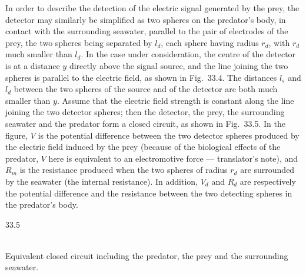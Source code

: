 In order to describe the detection of the electric signal generated by the prey, the detector may similarly be simplified as two spheres on the predator's body, in contact with the surrounding seawater, parallel to the pair of electrodes of the prey, the two spheres being separated by $l_d$, each sphere having radius $r_d$, with $r_d$ much smaller than $l_d$. In the case under consideration, the centre of the detector is at a distance $y$ directly above the signal source, and the line joining the two spheres is parallel to the electric field, as shown in Fig.~33.4. The distances $l_s$ and $l_d$ between the two spheres of the source and of the detector are both much smaller than $y$. Assume that the electric field strength is constant along the line joining the two detector spheres; then the detector, the prey, the surrounding seawater and the predator form a closed circuit, as shown in Fig.~33.5. In the figure, $V$ is the potential difference between the two detector spheres produced by the electric field induced by the prey (because of the biological effects of the predator, $V$ here is equivalent to an electromotive force --- translator's note), and $R_m$ is the resistance produced when the two spheres of radius $r_d$ are surrounded by the seawater (the internal resistance). In addition, $V_d$ and $R_d$ are respectively the potential difference and the resistance between the two detecting spheres in the predator's body.

\begin{figbox}{33.5}
\\[2pt]{\small Equivalent closed circuit including the predator, the prey and the surrounding seawater.}
\end{figbox}

